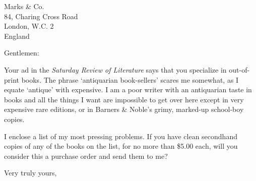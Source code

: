 \documentclass{letter}
\date{October 5, 1949}
\begin{document}
\begin{letter}{Marks \& Co.\\ 84, Charing Cross Road\\London, W.C. 2\\England}
\opening{Gentlemen:}

Your ad in the \textit{Saturday Review of Literature} says that you specialize in out-of-print books. The phrase `antiquarian book-sellers' scares me somewhat, as I equate `antique' with expensive. I am a poor writer with an antiquarian taste in books and all the things I want are impossible to get over here except in very expensive rare editions, or in Barners \& Noble's grimy, marked-up school-boy copies.

I enclose a list of my most pressing problems. If you have clean secondhand copies of any of the books on the list, for no more than \$5.00 each, will you consider this a purchase order and send them to me?

\closing{Very truly yours,}
\end{letter}
\end{document}
